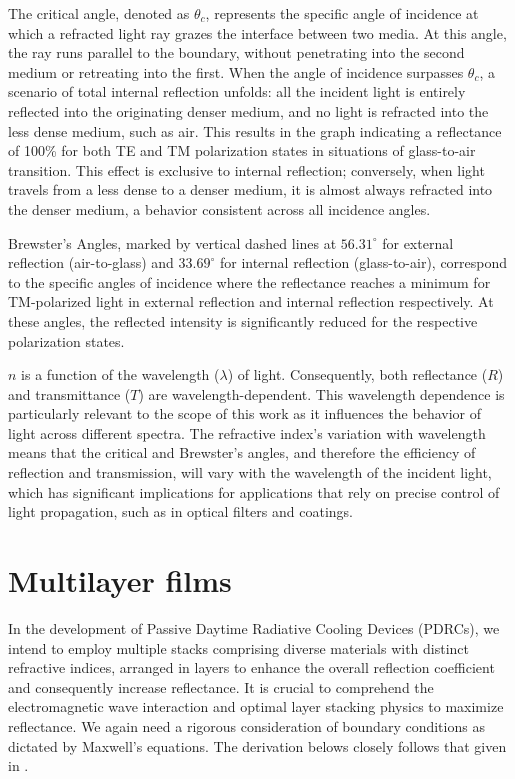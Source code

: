 The critical angle, denoted as $\theta_c$, represents the specific angle of incidence at which a refracted light ray grazes the interface between two media. At this angle, the ray runs parallel to the boundary, without penetrating into the second medium or retreating into the first. When the angle of incidence surpasses $\theta_c$, a scenario of total internal reflection unfolds: all the incident light is entirely reflected into the originating denser medium, and no light is refracted into the less dense medium, such as air. This results in the graph indicating a reflectance of 100\% for both TE and TM polarization states in situations of glass-to-air transition. This effect is exclusive to internal reflection; conversely, when light travels from a less dense to a denser medium, it is almost always refracted into the denser medium, a behavior consistent across all incidence angles.

Brewster's Angles, marked by vertical dashed lines at \(56.31^\circ\) for external reflection (air-to-glass) and \(33.69^\circ\) for internal reflection (glass-to-air), correspond to the specific angles of incidence where the reflectance reaches a minimum for TM-polarized light in external reflection and internal reflection respectively. At these angles, the reflected intensity is significantly reduced for the respective polarization states.

$n$ is a function of the wavelength ($\lambda$) of light. Consequently, both reflectance ($R$) and transmittance ($T$) are wavelength-dependent. This wavelength dependence is particularly relevant to the scope of this work as it influences the behavior of light across different spectra. The refractive index’s variation with wavelength means that the critical and Brewster's angles, and therefore the efficiency of reflection and transmission, will vary with the wavelength of the incident light, which has significant implications for applications that rely on precise control of light propagation, such as in optical filters and coatings.

\section{Multilayer films}
In the development of Passive Daytime Radiative Cooling Devices (PDRCs), we intend to employ multiple stacks comprising diverse materials with distinct refractive indices, arranged in layers to enhance the overall reflection coefficient and consequently increase reflectance. It is crucial to comprehend the electromagnetic wave interaction and optimal layer stacking physics to maximize reflectance. We again need a rigorous consideration of boundary conditions as dictated by Maxwell's equations. The derivation belows closely follows that given in \cite{pedrotti_introduction_2007}.

